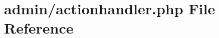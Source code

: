 \hypertarget{actionhandler_8php}{\section{admin/actionhandler.php File Reference}
\label{actionhandler_8php}
}
